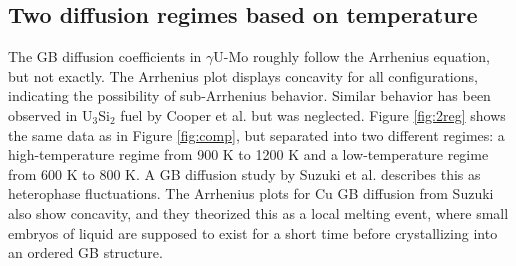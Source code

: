 \documentclass{elsarticle}
\begin{document}
\FloatBarrier
\subsection{Two diffusion regimes based on temperature}

The GB diffusion coefficients in $\gamma$U-Mo roughly follow the Arrhenius equation, but not exactly. The Arrhenius plot displays concavity for all configurations, indicating the possibility of sub-Arrhenius behavior. Similar behavior has been observed in U$_3$Si$_2$ fuel by Cooper et al. \cite{cooper2021} but was neglected. Figure \ref{fig:2reg} shows the same data as in Figure \ref{fig:comp}, but separated into two different regimes: a high-temperature regime from 900 K to 1200 K and a low-temperature regime from 600 K to 800 K. A GB diffusion study by Suzuki et al. \cite{suzuki2005} describes this as heterophase fluctuations. The Arrhenius plots for Cu GB diffusion from Suzuki also show concavity, and they theorized this as a local melting event, where small embryos of liquid are supposed to exist for a short time before crystallizing into an ordered GB structure.
\end{document}
